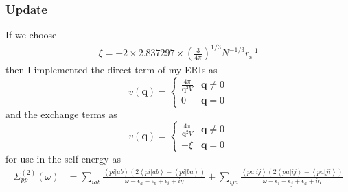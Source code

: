 \subsubsection{Update}
If we choose
\begin{align}
    \xi = -2 \times 2.837297 \times\left(\frac{3}{4 \pi}\right)^{1 / 3} N^{-1 / 3} r_{\mathrm{s}}^{-1}
\end{align}
then I implemented the direct term of my ERIs as 
\begin{equation}
    v(\mathbf{q}) = \begin{cases} \frac{4 \pi}{\mathbf{q}^2 V} & \mathbf{q} \neq 0 \\ 0 & \mathbf{q} = 0 \end{cases}
\end{equation}
and the exchange terms as
\begin{equation}
    v(\mathbf{q}) = \begin{cases} \frac{4 \pi}{\mathbf{q}^2 V} & \mathbf{q} \neq 0 \\ -\xi & \mathbf{q} = 0 \end{cases}
\end{equation}
for use in the self energy as
\begin{align}
    \Sigma^{(2)}_{pp}(\omega)
    & = \sum_{iab} \frac{\left<pi|ab\right>\left(2\left<pi|ab\right> - \left<pi|ba\right>\right)}{\omega - \epsilon_a - \epsilon_b + \epsilon_i + i \eta} + \sum_{ija} \frac{\left<pa|ij\right>\left(2\left<pa|ij\right> - \left<pa|ji\right>\right)}{\omega - \epsilon_i - \epsilon_j + \epsilon_a + i \eta}
\end{align}

